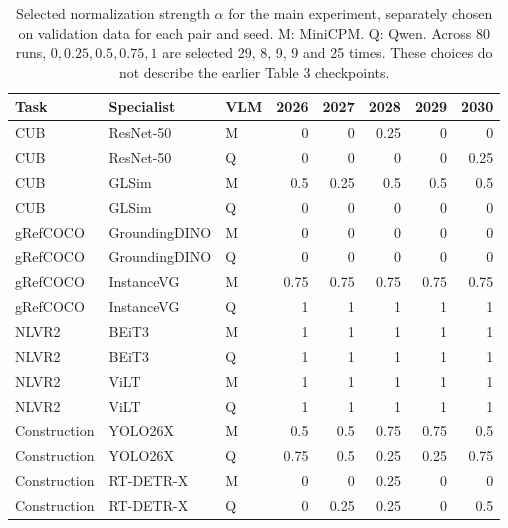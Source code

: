 \begin{table}[H]
\centering
\caption{Selected normalization strength $\alpha$ for the main experiment, separately chosen on validation data for each pair and seed. M: MiniCPM. Q: Qwen. Across 80 runs, $0,0.25,0.5,0.75,1$ are selected 29, 8, 9, 9 and 25 times. These choices do not describe the earlier Table 3 checkpoints.}
\label{tab:alpha}
\small
\begin{tabular}{lllrrrrr}
\toprule
Task & Specialist & VLM & 2026 & 2027 & 2028 & 2029 & 2030 \\
\midrule
CUB & ResNet-50 & M & 0 & 0 & 0.25 & 0 & 0 \\
CUB & ResNet-50 & Q & 0 & 0 & 0 & 0 & 0.25 \\
CUB & GLSim & M & 0.5 & 0.25 & 0.5 & 0.5 & 0.5 \\
CUB & GLSim & Q & 0 & 0 & 0 & 0 & 0 \\
gRefCOCO & GroundingDINO & M & 0 & 0 & 0 & 0 & 0 \\
gRefCOCO & GroundingDINO & Q & 0 & 0 & 0 & 0 & 0 \\
gRefCOCO & InstanceVG & M & 0.75 & 0.75 & 0.75 & 0.75 & 0.75 \\
gRefCOCO & InstanceVG & Q & 1 & 1 & 1 & 1 & 1 \\
NLVR2 & BEiT3 & M & 1 & 1 & 1 & 1 & 1 \\
NLVR2 & BEiT3 & Q & 1 & 1 & 1 & 1 & 1 \\
NLVR2 & ViLT & M & 1 & 1 & 1 & 1 & 1 \\
NLVR2 & ViLT & Q & 1 & 1 & 1 & 1 & 1 \\
Construction & YOLO26X & M & 0.5 & 0.5 & 0.75 & 0.75 & 0.5 \\
Construction & YOLO26X & Q & 0.75 & 0.5 & 0.25 & 0.25 & 0.75 \\
Construction & RT-DETR-X & M & 0 & 0 & 0.25 & 0 & 0 \\
Construction & RT-DETR-X & Q & 0 & 0.25 & 0.25 & 0 & 0.5 \\
\bottomrule
\end{tabular}
\end{table}
